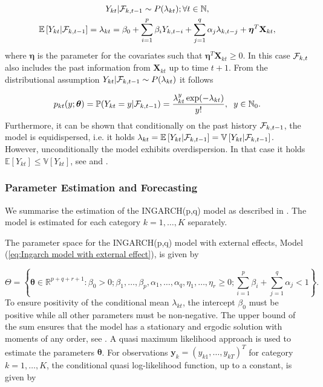 \begin{equation}
\begin{gathered}
\label{eq:Ingarch model with external effect}
Y_{kt} | \mathcal{F}_{k,t-1} \sim P(\lambda_{kt}); \forall t \in \mathbb{N}, \\
\mathbb{E}\left[Y_{kt} | \mathcal{F}_{k,t-1} \right] = \lambda_{kt} = \beta_0 + \sum_{i=1}^p\beta_i Y_{k,t-i} + \sum_{j=1}^q\alpha_j \lambda_{k,t-j} + \bm{\eta}^T\textbf{X}_{kt},
\end{gathered}
\end{equation}
%
where $\bm{\eta}$ is the parameter for the covariates such that $\bm{\eta}^T\textbf{X}_{kt} \geq 0$. In this case $\mathcal{F}_{k,t}$ also includes the past information from $\textbf{X}_{kt}$ up to time $t+1$. 
From the distributional assumption $Y_{kt} | \mathcal{F}_{k,t-1} \sim P(\lambda_{kt})$ it follows

\begin{equation}
p_{kt}(y;\bm{\theta})=\mathbb{P}(Y_{kt}=y | \mathcal{F}_{k,t-1}) = \frac{\lambda_{kt}^y \exp(-\lambda_{kt})}{y!}, \hspace{0.2cm} y \in \mathbb{N}_0.
\label{eq:Ingarch Distribution}
\end{equation}
%
Furthermore, it can be shown that conditionally on the past history $\mathcal{F}_{k,t-1}$, the model is equidispersed, i.e. it holds $\lambda_{kt} = \mathbb{E}\left[Y_{kt} | \mathcal{F}_{k,t-1}\right] = \mathbb{V}\left[Y_{kt} | \mathcal{F}_{k,t-1}\right]$. However, unconditionally the model exhibits overdispersion. In that case it holds $\mathbb{E}\left[Y_{kt}\right] \leq \mathbb{V}\left[Y_{kt}\right] $, see \textcite{Liboschik:2016} and \textcite{Heinen:2003}. 

\subsubsection{Parameter Estimation and Forecasting}
\label{sec: Estimation of the Ingarch Model}

We summarise the estimation of the INGARCH(p,q) model as described in \textcite{Liboschik:2016}. The model is estimated for each category $k=1,\ldots,K$ separately. 

The parameter space for the INGARCH(p,q) model with external effects, Model (\ref{eq:Ingarch model with external effect}), is given by 

\begin{equation}
\Theta = \left\{ \bm{\theta} \in \mathbb{R}^{p+q+r+1}: \beta_0 > 0; \beta_1,\ldots,\beta_p,\alpha_1,\ldots,\alpha_q,\eta_1,\ldots,\eta_r \geq 0; \sum_{i=1}^p\beta_i + \sum_{j=1}^q\alpha_j < 1 \right\}.
\label{eq:Ingarch parameter space}
\end{equation}
%
To ensure positivity of the conditional mean $\lambda_{kt}$, the intercept $\beta_0$ must be positive while all other parameters must be non-negative. The upper bound of the sum ensures that the model has a stationary and ergodic solution with moments of any order, see \textcite{Ferland:2006,Fokianos:2009,Doukhan:2012}. A quasi maximum likelihood approach is used to estimate the parameters $\bm{\theta}$. 
For observations $\textbf{y}_k = \left(y_{k1},\ldots,y_{kT}\right)^T$ for category $k=1,\ldots,K$, the conditional quasi log-likelihood function, up to a constant, is given by

